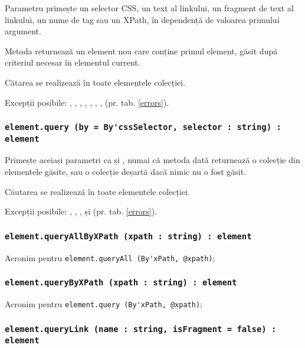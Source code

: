 Parametru  primește un selector CSS, un text al linkului, un fragment de text al linkului, un nume de tag sau un XPath, în dependență de valoarea primului argument.

Metoda returnează un element nou care conține primul element, găsit după criteriul necesar în elementul current.

\code{[icL]} Cătarea se realizează în toate elementele colecției.

Excepții posibile: , , , , , , ,  (pr. tab. \ref{errors}).

\subsubsection{\lstinline|element.query (by = By'cssSelector, selector : string) : element|}

Primește aceiași parametri ca și , numai că metoda dată returnează o colecție din elementele găsite, sau o colecție deșartă dacă nimic nu o fost găsit.

\code{[icL]} Căutarea se realizează în toate elementele colecției.

Excepții posibile: , , ,  și  (pr. tab. \ref{errors}).

\subsubsection{\lstinline|element.queryAllByXPath (xpath : string) : element|}

Acronim pentru \lstinline|element.queryAll (By'xPath, @xpath)|;

\subsubsection{\lstinline|element.queryByXPath (xpath : string) : element|}

Acronim pentru \lstinline|element.query (By'xPath, @xpath)|;

\subsubsection{\lstinline|element.queryLink (name : string, isFragment = false) : element|}

